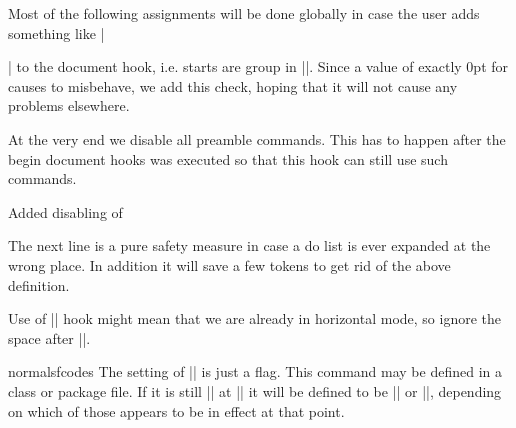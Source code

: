     Most of the following assignments will be done globally in case
    the user adds something like |\begin{multicols}| to the document
    hook, i.e. starts are group in ||.
    Since a value of exactly 0pt for  causes
     to misbehave, we add this check, hoping
    that it will not cause any problems elsewhere.
  \begin{teX}
  \ifdim\topskip<1sp\global\topskip 1sp\relax\fi
  \global\@maxdepth\maxdepth
  \global\let\@begindocumenthook\@undefined
  \ifx\@listfiles\@undefined
    \global\let\@filelist\relax
    \global\let\@addtofilelist\@gobble
  \fi
  \end{teX}

    At the very end we disable all preamble commands. This has to
    happen after the begin document hooks was executed so that this
    hook can still use such commands.


   Added disabling of 
  \begin{teX}
  \global\let \@nodocument \relax
  \end{teX}
   The next line is a pure safety measure in case a do list is ever
   expanded at the wrong place. In addition it will save a few
   tokens to get rid of the above definition.
  \begin{teX}
  \global\let\do\noexpand
  \end{teX}

    Use of |\AtBeginDocument| hook might mean that we are already in
    horizontal mode, so ignore the space after ||.
  \begin{teX}
  \ignorespaces}
  \end{teX}

  \begin{teX}
\@onlypreamble\document
  \end{teX}

 \begin{docCmd}{normalsfcodes}{}
 The setting of |\@empty| is just a flag. This command may be defined
 in a class or package file. If it is still |\@empty| at 
 || it will be defined to be |\frenchspacing| or
 |\nonfrenchspacing|, depending on which of those appears to be in
 effect at that point.
 \end{docCmd}
    \begin{teX}
\let\normalsfcodes\@empty
    \end{teX}



\end{multicols}
